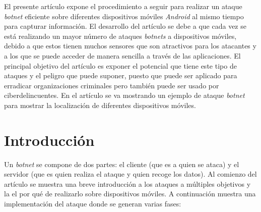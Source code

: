 \documentclass[a4paper,11pt]{report}
\begin{document}
El presente artículo expone el procedimiento a seguir para realizar un ataque \emph{botnet} eficiente sobre diferentes dispositivos móviles \emph{Android} al mismo tiempo para capturar información. El desarrollo del artículo se debe a que cada vez se está realizando un mayor número de ataques \emph{botnets} a dispositivos móviles, debido a que estos tienen muchos sensores que son atractivos para los atacantes y a los que se puede acceder de manera sencilla a través de las aplicaciones. El principal objetivo del artículo es exponer el potencial que tiene este tipo de ataques y el peligro que puede suponer, puesto que puede ser aplicado para erradicar organizaciones criminales pero también puede ser usado por ciberdelincuentes. En el artículo se va mostrando un ejemplo de ataque \emph{botnet} para mostrar la localización de diferentes dispositivos móviles.




\chapter{Introducción}

 Un \emph{botnet} se compone de dos partes: el cliente (que es a quien se ataca) y el servidor (que es quien realiza el ataque y quien recoge los datos). Al comienzo del artículo se muestra una breve introducción a los ataques a múltiples objetivos y la el por qué de realizarlo sobre dispositivos móviles. A continuación muestra una implementación del ataque donde se generan varias fases: 
\end{document}
